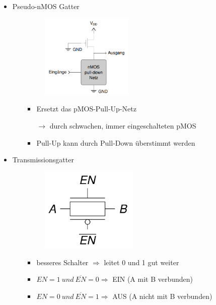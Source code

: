 \documentclass[11pt,a4paper]{article}
\begin{document}
\begin{itemize}
\begin{itemize}
		\item Pseudo-nMOS Gatter
			\begin{itemize}
			\item[]		
				\begin{minipage}{0.25\textwidth}
					\begin{figure}[H]
					\includegraphics[height=4cm]{pseudonmos}
					\end{figure}
				\end{minipage}
				\begin{minipage}[t]{0.6\textwidth}
					\vspace{-1.25cm}
					\begin{itemize}
					\item Ersetzt das pMOS-Pull-Up-Netz
					\item[$\rightarrow$] durch schwachen, immer eingeschalteten pMOS
					\item Pull-Up kann durch Pull-Down überstimmt werden
					\end{itemize}
				\end{minipage}
			\end{itemize}
		\item Transmissionsgatter
			\begin{itemize}
			\item[]		
				\begin{minipage}{0.25\textwidth}
					\begin{figure}[H]
					\includegraphics[height=4cm]{tgates}
					\end{figure}
				\end{minipage}
				\begin{minipage}[t]{0.6\textwidth}
					\vspace{-1.25cm}
					\begin{itemize}
					\item besseres Schalter $\Rightarrow$ leitet 0 und 1 gut weiter
					\item $EN = 1 ~ und ~ \overline{EN}=0 \Rightarrow$ EIN (A mit B verbunden)
					\item $EN = 0 ~ und ~ \overline{EN}=1 \Rightarrow$ AUS (A nicht mit B verbunden)
					\end{itemize}
				\end{minipage}
			\end{itemize}
	\end{itemize}


\end{itemize}
\end{document}
